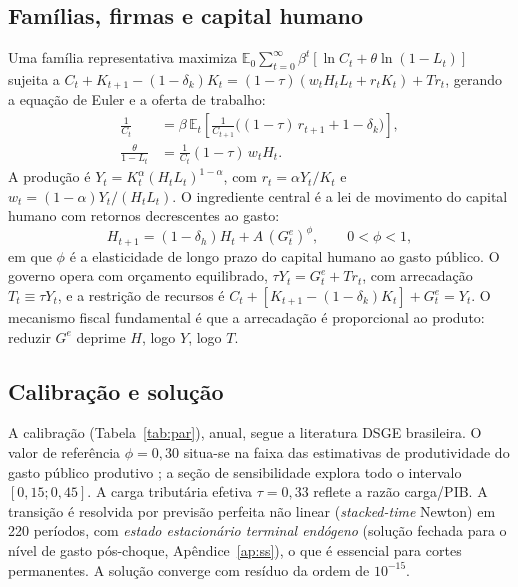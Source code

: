 \documentclass[12pt,a4paper]{article}
\newcommand{\Ee}{\mathbb{E}}
\begin{document}
\subsection{Fam\'ilias, firmas e capital humano}
Uma fam\'ilia representativa maximiza $\Ee_0 \sum_{t=0}^{\infty} \beta^t [\ln C_t + \theta \ln(1 - L_t)]$ sujeita a
$C_t + K_{t+1} - (1-\delta_k)K_t = (1-\tau)(w_t H_t L_t + r_t K_t) + \mathit{Tr}_t$,
gerando a equa\c{c}\~ao de Euler e a oferta de trabalho:
\begin{align}
\tfrac{1}{C_t} &= \beta\,\Ee_t\!\left[\tfrac{1}{C_{t+1}}\big((1-\tau)\,r_{t+1} + 1 - \delta_k\big)\right], \label{eq:euler}\\
\tfrac{\theta}{1-L_t} &= \tfrac{1}{C_t}(1-\tau)\,w_t H_t. \label{eq:labor}
\end{align}
A produ\c{c}\~ao \'e $Y_t = K_t^{\alpha}(H_t L_t)^{1-\alpha}$, com $r_t=\alpha Y_t/K_t$ e $w_t=(1-\alpha)Y_t/(H_tL_t)$. O ingrediente central \'e a lei de movimento do capital humano com retornos decrescentes ao gasto:
\begin{equation}\label{eq:lomh}
H_{t+1} = (1-\delta_h)H_t + A\,(G^e_t)^{\phi}, \qquad 0<\phi<1,
\end{equation}
em que $\phi$ \'e a elasticidade de longo prazo do capital humano ao gasto p\'ublico. O governo opera com or\c{c}amento equilibrado, $\tau Y_t = G^e_t + \mathit{Tr}_t$, com arrecada\c{c}\~ao $T_t\equiv\tau Y_t$, e a restri\c{c}\~ao de recursos \'e $C_t + [K_{t+1}-(1-\delta_k)K_t] + G^e_t = Y_t$. O mecanismo fiscal fundamental \'e que a arrecada\c{c}\~ao \'e proporcional ao produto: reduzir $G^e$ deprime $H$, logo $Y$, logo $T$.

\subsection{Calibra\c{c}\~ao e solu\c{c}\~ao}
A calibra\c{c}\~ao (Tabela~\ref{tab:par}), anual, segue a literatura DSGE brasileira. O valor de refer\^encia $\phi=0{,}30$ situa-se na faixa das estimativas de produtividade do gasto p\'ublico produtivo \citep{bomligthart2014}; a se\c{c}\~ao de sensibilidade explora todo o intervalo $[0{,}15;0{,}45]$. A carga tribut\'aria efetiva $\tau=0{,}33$ reflete a raz\~ao carga/PIB. A transi\c{c}\~ao \'e resolvida por previs\~ao perfeita n\~ao linear (\emph{stacked-time} Newton) em 220 per\'iodos, com \emph{estado estacion\'ario terminal end\'ogeno} (solu\c{c}\~ao fechada para o n\'ivel de gasto p\'os-choque, Ap\^endice~\ref{ap:ss}), o que \'e essencial para cortes permanentes. A solu\c{c}\~ao converge com res\'iduo da ordem de $10^{-15}$.
\end{document}
